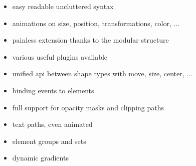 \begin{itemize}
\item easy readable uncluttered syntax
\item    animations on size, position, transformations, color, ...
 \item   painless extension thanks to the modular structure
    \item various useful plugins available
   \item unified api between shape types with move, size, center, ...
   \item binding events to elements
   \item full support for opacity masks and clipping paths
   \item text paths, even animated
 \item   element groups and sets
\item   dynamic gradients
\end{itemize}